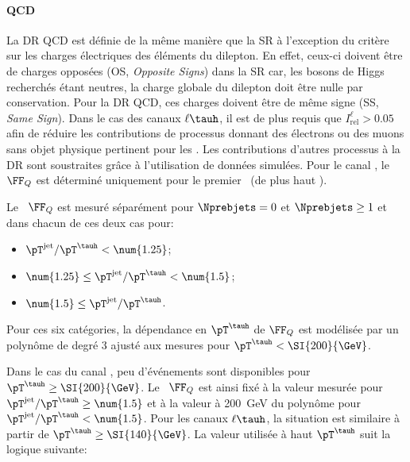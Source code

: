 \paragraph{QCD}
La DR QCD est définie de la même manière que la SR à l'exception du critère sur les charges électriques des éléments du dilepton.
En effet, ceux-ci doivent être de charges opposées (OS, \emph{Opposite Signs}) dans la SR car, les bosons de Higgs recherchés étant neutres, la charge globale du dilepton doit être nulle par conservation.
Pour la DR QCD, ces charges doivent être de même signe (SS, \emph{Same Sign}).
Dans le cas des canaux $\ell\tauh$, il est de plus requis que $I_\text{rel}^{\ell} > \num{0.05}$ afin de réduire les contributions de processus donnant des électrons ou des muons sans objet physique pertinent pour les \fakefactors.
Les contributions d'autres processus à la DR sont soustraites grâce à l'utilisation de données simulées.
Pour le canal \tauh\tauh, le \fakefactor\ $\FF_Q$ est déterminé uniquement pour le premier \tauh\ (de plus haut \pT).
\par
Le \fakefactor\ $\FF_Q$ est mesuré séparément pour
$\Nprebjets=0$
et
$\Nprebjets\geq1$
et dans chacun de ces deux cas pour:
\begin{itemize}
\item $\pT^\text{jet}/\pT^{\tauh} < \num{1.25}$;
\item $\num{1.25} \leq \pT^\text{jet}/\pT^{\tauh} < \num{1.5}$;
\item $\num{1.5} \leq \pT^\text{jet}/\pT^{\tauh}$.
\end{itemize}
Pour ces six catégories, la dépendance en $\pT^{\tauh}$ de $\FF_Q$ est modélisée par un polynôme de degré 3 ajusté aux mesures pour $\pT^{\tauh}<\SI{200}{\GeV}$.
\par
Dans le cas du canal \tauh\tauh, peu d'événements sont disponibles pour $\pT^{\tauh}\geq\SI{200}{\GeV}$.
Le \fakefactor\ $\FF_Q$ est ainsi fixé à la valeur mesurée pour $\pT^\text{jet}/\pT^{\tauh} \geq \num{1.5}$ et à la valeur à \SI{200}{\GeV} du polynôme pour $\pT^\text{jet}/\pT^{\tauh} < \num{1.5}$.
Pour les canaux $\ell\tauh$, la situation est similaire à partir de $\pT^{\tauh}\geq\SI{140}{\GeV}$.
La valeur utilisée à haut $\pT^{\tauh}$ suit la logique suivante:
